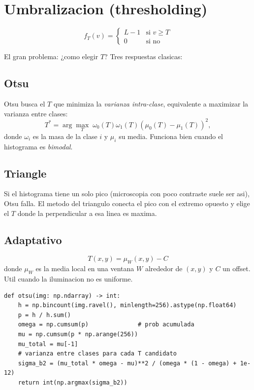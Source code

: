 \documentclass[11pt,a4paper,twoside,openright]{book}
\begin{document}
\section{Umbralizacion (thresholding)}

\begin{equation}
f_T(v) = \begin{cases} L{-}1 & \text{si } v \geq T \\ 0 & \text{si no} \end{cases}
\end{equation}

El gran problema: ¿como elegir $T$? Tres respuestas clasicas:

\subsection{Otsu}

Otsu busca el $T$ que minimiza la \emph{varianza intra-clase}, equivalente a maximizar la varianza entre clases:
\begin{equation}
T^* = \arg\max_T \; \omega_0(T) \omega_1(T) (\mu_0(T) - \mu_1(T))^2,
\label{eq:otsu}
\end{equation}
donde $\omega_i$ es la masa de la clase $i$ y $\mu_i$ su media. Funciona bien cuando el histograma es \emph{bimodal}.

\subsection{Triangle}

Si el histograma tiene un solo pico (microscopia con poco contraste suele ser asi), Otsu falla. El metodo del triangulo conecta el pico con el extremo opuesto y elige el $T$ donde la perpendicular a esa linea es maxima.

\subsection{Adaptativo}

\begin{equation}
T(x,y) = \mu_W(x,y) - C
\end{equation}
donde $\mu_W$ es la media local en una ventana $W$ alrededor de $(x,y)$ y $C$ un offset. Util cuando la iluminacion no es uniforme.

\begin{lstlisting}[caption={Otsu en NumPy puro.}]
def otsu(img: np.ndarray) -> int:
    h = np.bincount(img.ravel(), minlength=256).astype(np.float64)
    p = h / h.sum()
    omega = np.cumsum(p)              # prob acumulada
    mu = np.cumsum(p * np.arange(256))
    mu_total = mu[-1]
    # varianza entre clases para cada T candidato
    sigma_b2 = (mu_total * omega - mu)**2 / (omega * (1 - omega) + 1e-12)
    return int(np.argmax(sigma_b2))
\end{lstlisting}
\end{document}
